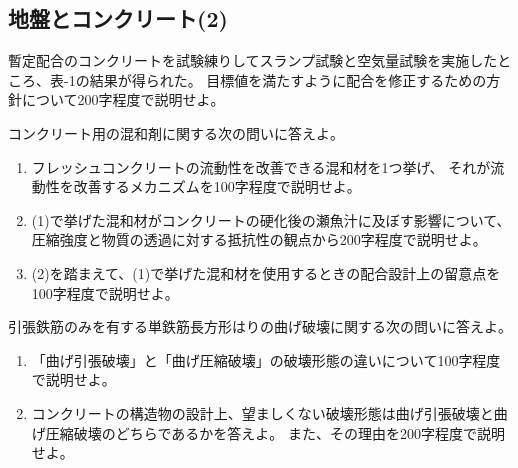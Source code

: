 \subsection{地盤とコンクリート(2)}

暫定配合のコンクリートを試験練りしてスランプ試験と空気量試験を実施したところ、表-1の結果が得られた。
目標値を満たすように配合を修正するための方針について200字程度で説明せよ。

コンクリート用の混和剤に関する次の問いに答えよ。
\begin{enumerate}[(1)]
  \item フレッシュコンクリートの流動性を改善できる混和材を1つ挙げ、
        それが流動性を改善するメカニズムを100字程度で説明せよ。
  \item (1)で挙げた混和材がコンクリートの硬化後の瀬魚汁に及ぼす影響について、
        圧縮強度と物質の透過に対する抵抗性の観点から200字程度で説明せよ。
  \item (2)を踏まえて、(1)で挙げた混和材を使用するときの配合設計上の留意点を100字程度で説明せよ。
\end{enumerate}

引張鉄筋のみを有する単鉄筋長方形はりの曲げ破壊に関する次の問いに答えよ。
\begin{enumerate}[(1)]
  \item 「曲げ引張破壊」と「曲げ圧縮破壊」の破壊形態の違いについて100字程度で説明せよ。
  \item コンクリートの構造物の設計上、望ましくない破壊形態は曲げ引張破壊と曲げ圧縮破壊のどちらであるかを答えよ。
        また、その理由を200字程度で説明せよ。
\end{enumerate}